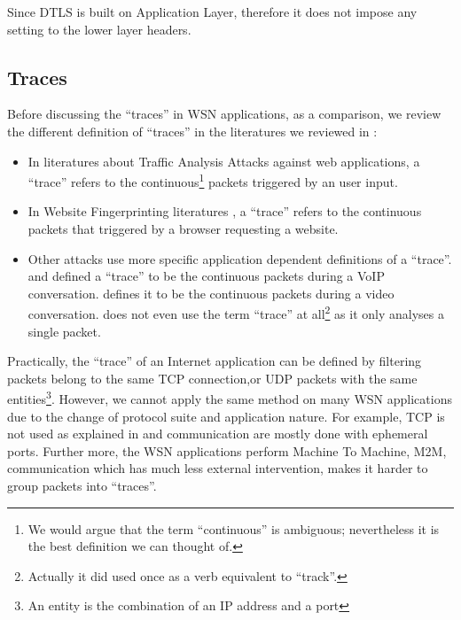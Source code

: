 Since DTLS is built on Application Layer, therefore it does not impose any setting to the lower layer headers. 

\subsection{Traces} \label{Subsec: Traces}

Before discussing the ``traces'' in WSN applications, as a comparison, we review the different definition of ``traces'' in the literatures we reviewed in :

\begin{itemize}
	\item In literatures about Traffic Analysis Attacks against web applications\cite{WebSideChannel}\cite{PinpointWeb}\cite{SearchAttack}, a ``trace'' refers to the continuous\footnote{We would argue that the term ``continuous'' is ambiguous; nevertheless it is the best definition we can thought of.} packets triggered by an user input.
	\item In Website Fingerprinting literatures\cite{WebsiteFingerprint} \cite{HClassifier} \cite{PClassifier} \cite{Peekaboo}, a ``trace'' refers to the continuous packets that triggered by a browser requesting a website.
	\item Other attacks use more specific application dependent definitions of a ``trace''. \cite{VoIPLanguage} and \cite{VoIPPhrases} defined a ``trace'' to be the continuous packets during a VoIP conversation. \cite{Video} defines it to be the continuous packets during a video conversation. \cite{AppleMessage} does not even use the term ``trace'' at all\footnote{Actually it did used once as a verb equivalent to ``track''.} as it only analyses a single packet.
\end{itemize}

Practically, the ``trace'' of an Internet application can be defined by filtering packets belong to the same TCP connection,or UDP packets with the same entities\footnote{An entity is the combination of an IP address and a port}. However, we cannot apply the same method on many WSN applications due to the change of protocol suite and application nature. For example, TCP is not used as explained in  and communication are mostly done with ephemeral ports. Further more, the WSN applications perform Machine To Machine, M2M, communication which has much less external intervention, makes it harder to group packets into ``traces''.

